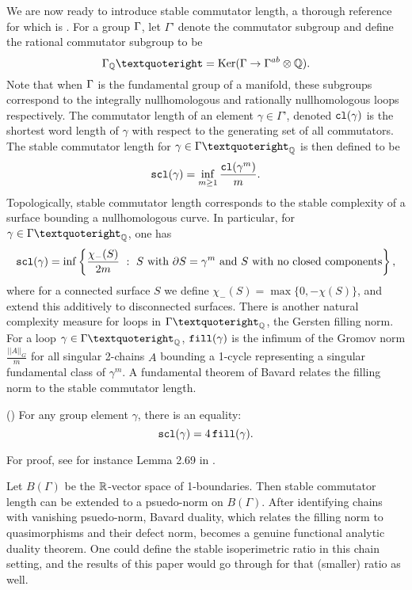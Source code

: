 We are now ready to introduce stable commutator length, a thorough reference for which is \cite{Calegari}. For a group  $\Gamma$, let  $\Gamma’$ denote the commutator subgroup and define the rational commutator subgroup to be $$\G_{\Q}’ = \text{Ker}(\Gamma\to \Gamma^{ab}\otimes \Q).$$ Note that when $\Gamma$ is the fundamental group of a manifold, these subgroups correspond to the integrally nullhomologous and rationally nullhomologous loops respectively. The commutator length of an element $\gamma\in \Gamma’$, denoted ${\tt{cl}}(\gamma)$ is the shortest word length of $\gamma$ with respect to the generating set of all commutators.
The stable commutator length for $\gamma\in \G’_{\Q}$ is then defined to be \[\operatorname{{\tt{scl}}}(\gamma) = \inf\limits_{m\geq 1}\frac{{\tt{cl}}(\gamma^m)}{m}.\] Topologically, stable commutator length corresponds to the stable complexity of a surface bounding a nullhomologous curve. In particular, for $\gamma\in \Gamma’_{\Q}$, one has $$\operatorname{{\tt{scl}}}(\gamma) = \inf\left\{\frac{\chi_-(S)}{2m}~:~S \text{ with }\partial S = \gamma^m \text{ and $S$ with no closed components}\right\},$$
where for a connected surface $S$ we define $\chi_-(S) = \max\{0,-\chi(S)\}$, and extend this additively to disconnected surfaces.
There is another natural complexity measure for loops in $\G’_\Q$, the Gersten filling norm. For a loop $\gamma\in \G’_\Q$, $\operatorname{{\tt{fill}}}(\gamma)$ is the infimum of the Gromov norm $\frac{||A||_G}{m}$ for all singular 2-chains $A$ bounding a 1-cycle representing a singular fundamental class of $\gamma^m$. A fundamental theorem of Bavard relates the filling norm to the stable commutator length.

\begin{thm} \label{thm:4.3} (\cite{Bavard}) For any group element $\gamma$, there is an equality: \[\operatorname{{\tt{scl}}}(\gamma) = 4\operatorname{{\tt{fill}}}(\gamma).\]
\end{thm}
For proof, see for instance Lemma 2.69 in \cite{Calegari}.

\begin{remark} Let $B(\Gamma)$ be the $\mathbb R$-vector space of 1-boundaries. Then stable commutator length can be extended to a psuedo-norm on $B(\Gamma)$. After identifying chains with vanishing psuedo-norm, Bavard duality, which relates the filling norm to quasimorphisms and their defect norm, becomes a genuine functional analytic duality theorem. One could define the stable isoperimetric ratio in this chain setting, and the results of this paper would go through for that (smaller) ratio as well.
\end{remark}

